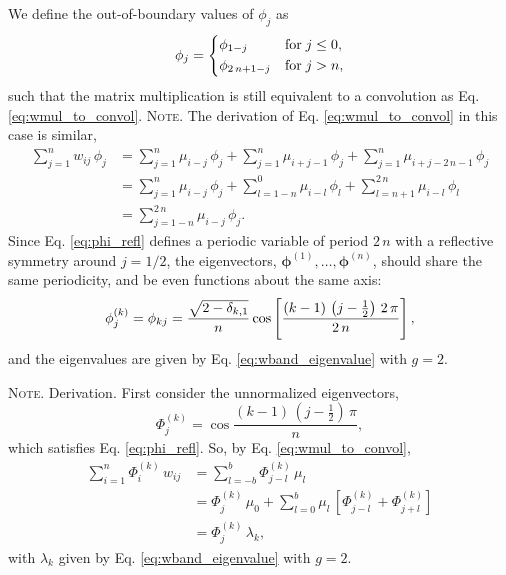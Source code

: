\documentclass[reprint, superscriptaddress, floatfix]{revtex4-1}
\newcommand{\note}[1]{{\color{DarkGreen}\footnotesize \textsc{Note.} #1}}
\begin{document}




We define the out-of-boundary values
of $\phi_j$ as
%
\begin{equation}
  \phi_j
  =
  \begin{dcases}
    \phi_{ 1 - j }           & \mathrm{for \;} j \le 0, \\
    \phi_{ 2 \, n + 1 - j }  & \mathrm{for \;} j > n,
  \end{dcases}
\label{eq:phi_refl}
\end{equation}
%
such that the matrix multiplication is still equivalent to
a convolution as Eq. \eqref{eq:wmul_to_convol}.
%
\note{The derivation of Eq. \eqref{eq:wmul_to_convol}
  in this case is similar,
  $$
  \begin{aligned}
    \sum_{j = 1}^n w_{ij} \, \phi_j
    &=
    \sum_{j = 1}^n
      \mu_{i - j} \, \phi_j
    +
    \sum_{j = 1}^n
      \mu_{i + j - 1} \, \phi_j
    +
    \sum_{j = 1}^n
      \mu_{i + j - 2 \, n - 1} \, \phi_j
    \\
    &=
    \sum_{j = 1}^n
      \mu_{i - j} \, \phi_j
    +
    \sum_{l = 1 - n}^0
      \mu_{i - l} \, \phi_l
    +
    \sum_{l = n + 1}^{ 2 \, n }
      \mu_{i - l} \, \phi_l
    \\
    &=
    \sum_{j = 1 - n}^{ 2 \, n}
      \mu_{i - j} \, \phi_j.
  \end{aligned}
  $$
}%
%
Since Eq. \eqref{eq:phi_refl}
defines a periodic variable of period $2 \, n$
with a reflective symmetry around $j = 1/2$,
the eigenvectors,
$\pmb\phi^{(1)}, \dots, \pmb\phi^{(n)}$,
should share the same periodicity,
and be even functions about the same axis:
%
\begin{equation}
  \phi^{(k)}_j
  =
  \phi_{k j}
  =
  \frac{ \sqrt{ 2 - \delta_{k, 1} } }
       {             n              }
  \cos \left[
       \frac{ ( k - 1) \, \left( j - \frac 1 2 \right) \, 2 \, \pi}
            {                    2 \, n                           }
       \right]
  ,
\notag
\end{equation}
%
and the eigenvalues are given by
  Eq. \eqref{eq:wband_eigenvalue}
  with $g = 2$.

\note{Derivation.
  First consider the unnormalized eigenvectors,
  $$
  \Phi^{(k)}_j
  =
  \cos \frac{ (k - 1) \, \left( j - \frac 1 2 \right) \, \pi }{n},
  $$
  which satisfies Eq. \eqref{eq:phi_refl}.
  So, by Eq. \eqref{eq:wmul_to_convol},
  $$
  \begin{aligned}
  \sum_{i = 1}^n
    \Phi^{(k)}_i \, w_{ij}
  &=
  \sum_{l = -b}^b
    \Phi^{(k)}_{j - l} \, \mu_l
  \\
  &=
    \Phi^{(k)}_j \, \mu_0
  + \sum_{l=0}^{b}
    \mu_l \,
    \left[
      \Phi^{(k)}_{j-l}
      +
      \Phi^{(k)}_{j+l}
    \right]
  \\
  &= \Phi^{(k)}_j \, \lambda_k,
  \end{aligned}
  $$
  with $\lambda_k$ given by Eq. \eqref{eq:wband_eigenvalue}
  with $g = 2$.
}%
%
\end{document}
